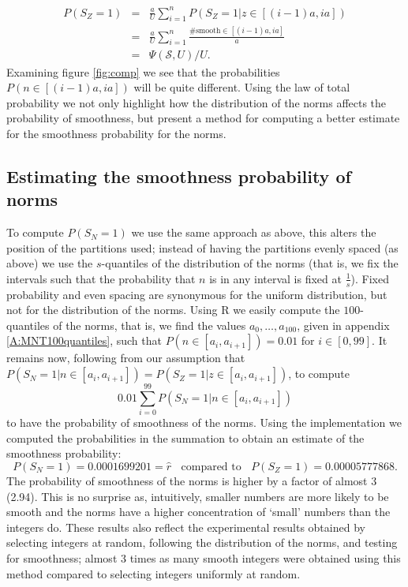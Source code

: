 \documentclass[a4paper, 10pt, envcountsect, runningheads]{article}
\numberwithin{figure}{section}
\numberwithin{equation}{section}
\begin{document}
\begin{eqnarray*}
P(S_Z=1)&=&\frac{a}{U}\sum_{i=1}^{n}P(S_Z=1| z\in[(i-1)a,ia])\\
&=&\frac{a}{U}\sum_{i=1}^{n}\frac{\#\mbox{smooth}\in[(i-1)a,ia]}{a}\\
&=&\Psi(\mathcal{S},U)/U.
\end{eqnarray*}
Examining figure \ref{fig:comp} we see that the probabilities $P(n\in[(i-1)a,ia])$ will be quite different. Using the law of total probability we not only highlight how the distribution of the norms affects the probability of smoothness, but present a method for computing a better estimate for the smoothness probability for the norms. 

\subsection{Estimating the smoothness probability of norms}
\label{ss:smoothness}
To compute $P(S_N=1)$ we use the same approach as above, this alters the position of the partitions used; instead of having the partitions evenly spaced (as above) we use the $s$-quantiles of the distribution of the norms (that is, we fix the intervals such that the probability that $n$ is in any interval is fixed at $\frac{1}{s}$). Fixed probability and even spacing are synonymous for the uniform distribution, but not for the distribution of the norms. Using R we easily compute the $100$-quantiles of the norms, that is, we find the values $a_0,\ldots,a_{100}$, given in appendix \ref{A:MNT100quantiles}, such that $P(n\in[a_i,a_{i+1}])=0.01$ for $i\in[0,99]$. It remains now, following from our assumption that $P(S_N=1| n\in[a_i,a_{i+1}])=P(S_Z=1| z\in[a_i,a_{i+1}])$, to compute $$0.01\sum_{i=0}^{99}P(S_N=1| n\in[a_i,a_{i+1}])$$ to have the probability of smoothness of the norms. Using the implementation \cite{dan_imp} we computed the probabilities in the summation to obtain an estimate of the smoothness probability: $$P(S_N=1)=0.0001699201=\hat{r}\;\;\mbox{ compared to }\;\;P(S_Z=1)=0.00005777868.$$
The probability of smoothness of the norms is higher by a factor of almost 3 (2.94). This is no surprise as, intuitively, smaller numbers are more likely to be smooth and the norms have a higher concentration of `small' numbers than the integers do. These results also reflect the experimental results obtained by selecting integers at random, following the distribution of the norms, and testing for smoothness; almost 3 times as many smooth integers were obtained using this method compared to selecting integers uniformly at random.
\end{document}

